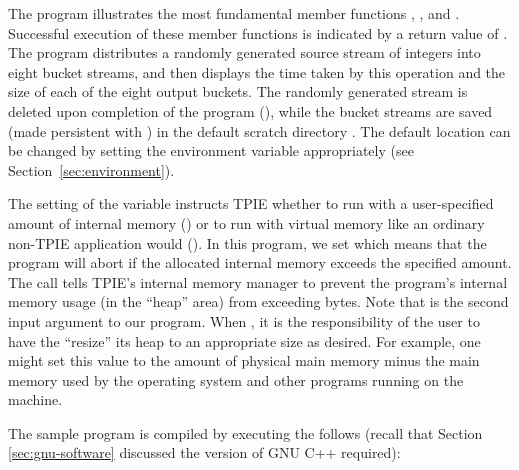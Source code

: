 The program illustrates the most fundamental
 member functions ,
,  and .
Successful execution of these member functions is indicated
by a return value of .  The program
distributes a randomly generated source stream of integers
into eight bucket streams, and then displays the time taken
by this operation and the size of each of the eight output
buckets. The randomly generated stream is deleted upon
completion of the program
(), while the bucket
streams are saved (made persistent with
) in the
default scratch directory . The default
location can be changed by setting the environment variable
 appropriately (see
Section~\ref{sec:environment}).

The setting of the  variable instructs TPIE whether to
run with a user-specified amount of internal memory ()
or to run with virtual memory like an ordinary non-TPIE application
would (). In this program, we set
 which means that the program will abort if the
allocated internal memory exceeds the specified amount. The call
 tells TPIE's internal memory
manager  to prevent the program's internal
memory usage (in the ``heap'' area) from exceeding 
bytes. Note that  is the second input argument to our
program. When , it is the responsibility of the
user to have the  ``resize'' its heap to an appropriate
size as desired. For example, one might set this value to
the amount of physical main
memory minus the main memory used by the operating system and other
programs running on the machine.



The sample program is compiled by executing the follows
(recall that Section \ref{sec:gnu-software} discussed the version of GNU C++
required):


